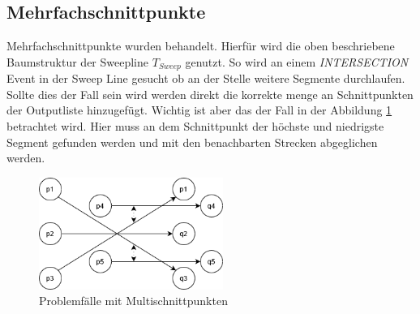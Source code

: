 \documentclass[conference]{IEEEtran}
\begin{document}
	\subsection{Mehrfachschnittpunkte}
	Mehrfachschnittpunkte wurden behandelt. Hierfür wird die oben beschriebene Baumstruktur der Sweepline $T_{Sweep}$ genutzt. So wird an einem \textit{INTERSECTION} Event in der Sweep Line gesucht ob an der Stelle weitere Segmente durchlaufen. Sollte dies der Fall sein wird werden direkt die korrekte menge an Schnittpunkten der Outputliste hinzugefügt. Wichtig ist aber das der Fall in der Abbildung \ref{Multi} betrachtet wird. Hier muss an dem Schnittpunkt der höchste und niedrigste Segment gefunden werden und mit den benachbarten Strecken abgeglichen werden.
	\begin{figure}[h]
		\begin{center}
			\includegraphics[width=6cm]{MultiSchnitt.png}
			\caption{Problemfälle mit Multischnittpunkten}
			\label{Multi}
		\end{center}
	\end{figure}
	
\end{document}
